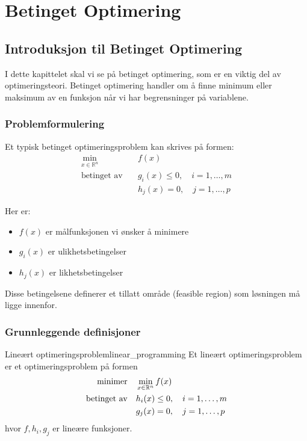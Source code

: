 \part{Betinget Optimering}

\chapter{Introduksjon til Betinget Optimering}

I dette kapittelet skal vi se på betinget optimering, som er en viktig del av optimeringsteori. Betinget optimering handler om å finne minimum eller maksimum av en funksjon når vi har begrensninger på variablene.

\section{Problemformulering}

Et typisk betinget optimeringsproblem kan skrives på formen:
\begin{align*}
	\min_{x \in \mathbb{R}^n} \quad & f(x)                                \\
	\text{betinget av} \quad        & g_i(x) \leq 0, \quad i = 1,\ldots,m \\
	                                & h_j(x) = 0, \quad j = 1,\ldots,p
\end{align*}

Her er:
\begin{itemize}
	\item $f(x)$ er målfunksjonen vi ønsker å minimere
	\item $g_i(x)$ er ulikhetsbetingelser
	\item $h_j(x)$ er likhetsbetingelser
\end{itemize}

Disse betingelsene definerer et tillatt område (feasible region) som løsningen må ligge innenfor.

\section{Grunnleggende definisjoner}

\begin{definition}{Lineært optimeringsproblem}{linear_programming}
	Et lineært optimeringsproblem er et optimeringsproblem på formen
	\begin{align*}
		\text{minimer}     & \quad \min_{x \in \mathbb{R}^n} f(x)                \\
		\text{betinget av} & \quad h_i(x) \leq 0, \quad i = 1, \ldots, m \\
		                   & \quad g_j(x) = 0, \quad j = 1, \ldots, p
	\end{align*}
	hvor \(f, h_i, g_j\) er lineære funksjoner.
\end{definition}

